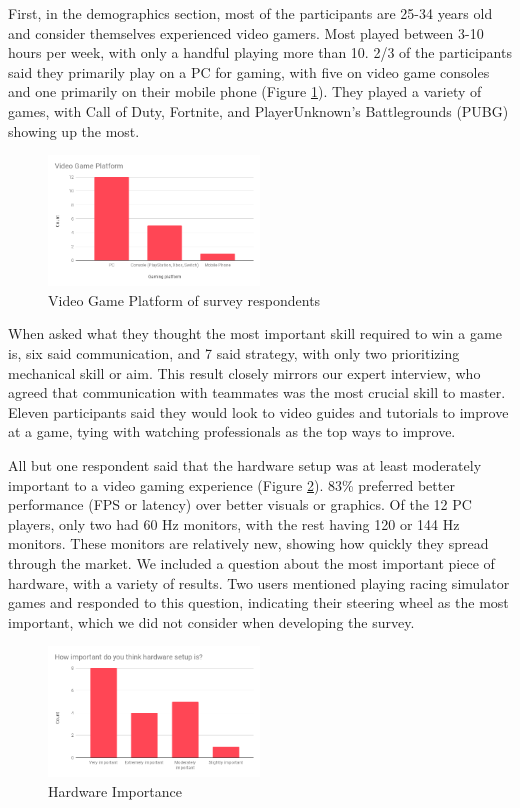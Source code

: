 \documentclass[11pt,manuscript,screen,review]{acmart} %
\begin{document}
First, in the demographics section, most of the participants are 25-34 years old and consider themselves experienced video gamers. Most played between 3-10 hours per week, with only a handful playing more than 10. 2/3 of the participants said they primarily play on a PC for gaming, with five on video game consoles and one primarily on their mobile phone (Figure \ref{fig:amt-platform}). They played a variety of games, with Call of Duty, Fortnite, and PlayerUnknown's Battlegrounds (PUBG) showing up the most.

\begin{figure}[h]
    \centering
    \includegraphics[width=0.5\textwidth]{img/amt-platform.png}
    \caption{Video Game Platform of survey respondents}
    \label{fig:amt-platform}
\end{figure}

When asked what they thought the most important skill required to win a game is, six said communication, and 7 said strategy, with only two prioritizing mechanical skill or aim. This result closely mirrors our expert interview, who agreed that communication with teammates was the most crucial skill to master. Eleven participants said they would look to video guides and tutorials to improve at a game, tying with watching professionals as the top ways to improve. 

All but one respondent said that the hardware setup was at least moderately important to a video gaming experience (Figure \ref{fig:amt-hardware}). 83\% preferred better performance (FPS or latency) over better visuals or graphics. Of the 12 PC players, only two had 60 Hz monitors, with the rest having 120 or 144 Hz monitors. These monitors are relatively new, showing how quickly they spread through the market. We included a question about the most important piece of hardware, with a variety of results. Two users mentioned playing racing simulator games and responded to this question, indicating their steering wheel as the most important, which we did not consider when developing the survey.

\begin{figure}[h]
    \centering
    \includegraphics[width=0.5\textwidth]{img/amt-hardware.png}
    \caption{Hardware Importance}
    \label{fig:amt-hardware}
\end{figure}
\end{document}
